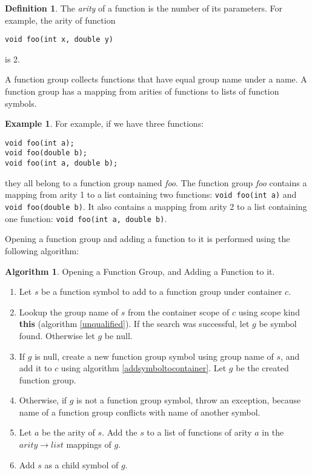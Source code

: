 \documentclass[a4paper,oneside,11pt]{book}
\theoremstyle{definition}
\newtheorem{exmp}{Example}[section]
\newtheorem{algo}{Algorithm}[section]
\newtheorem{defn}{Definition}[section]
\begin{document}
\begin{defn} The \emph{arity} of a function is the number of its parameters.
For example, the arity of function
\begin{verbatim}
void foo(int x, double y)
\end{verbatim}
is 2.
\end{defn}

A function group collects functions that have equal group name under a name.
A function group has a mapping from arities of functions to lists of function symbols.

\begin{exmp}
For example, if we have three functions:
\begin{verbatim}
void foo(int a);
void foo(double b);
void foo(int a, double b);
\end{verbatim}

they all belong to a function group named \emph{foo}.
The function group \emph{foo} contains a mapping from arity 1 to a list containing two functions:
\verb|void foo(int a)| and \verb|void foo(double b)|.
It also contains a mapping from arity 2 to a list containing one function:
\verb|void foo(int a, double b)|.
\end{exmp}

Opening a function group and adding a function to it is performed using the following algorithm:

\begin{algo}\label{addtofunctiongroup} Opening a Function Group, and Adding a Function to it.
\begin{enumerate}
\item
Let $s$ be a function symbol to add to a function group under container $c$.
\item
Lookup the group name of $s$ from the container scope of $c$ using scope kind \textbf{this} (algorithm \ref{unqualified}).
If the search was successful, let $g$ be symbol found. Otherwise let $g$ be null.
\item
If $g$ is null, create a new function group symbol using group name of $s$, and add it to $c$ using
algorithm \ref{addsymboltocontainer}. Let $g$ be the created function group.
\item
Otherwise, if $g$ is not a function group symbol, throw an exception, because name of a function group
conflicts with name of another symbol.
\item
Let $a$ be the arity of $s$. Add the $s$ to a list of functions of arity $a$ in the $arity \rightarrow list$ mappings of $g$.
\item
Add $s$ as a child symbol of $g$.
\end{enumerate}
\end{algo}
\end{document}
